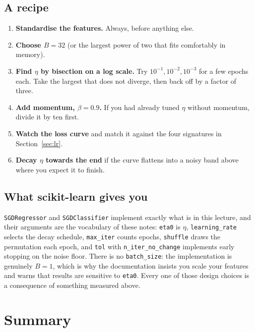 \documentclass[11pt]{article}
\begin{document}
\subsection{A recipe}

\begin{enumerate}[leftmargin=*]
  \item \textbf{Standardise the features.} Always, before anything else.
  \item \textbf{Choose $B = 32$} (or the largest power of two that fits
    comfortably in memory).
  \item \textbf{Find $\eta$ by bisection on a log scale.} Try
    $10^{-1}, 10^{-2}, 10^{-3}$ for a few epochs each. Take the largest that
    does not diverge, then back off by a factor of three.
  \item \textbf{Add momentum, $\beta = 0.9$.} If you had already tuned $\eta$
    without momentum, divide it by ten first.
  \item \textbf{Watch the loss curve} and match it against the four signatures
    in Section~\ref{sec:lr}.
  \item \textbf{Decay $\eta$ towards the end} if the curve flattens into a
    noisy band above where you expect it to finish.
\end{enumerate}

\subsection{What scikit-learn gives you}

\begin{sloppypar}
\texttt{SGDRegressor} and \texttt{SGDClassifier} implement exactly what is in
this lecture, and their arguments are the vocabulary of these notes:
\texttt{eta0} is $\eta$, \texttt{learning\_rate} selects the decay schedule,
\texttt{max\_iter} counts epochs, \texttt{shuffle} draws the permutation each
epoch, and \texttt{tol} with \texttt{n\_iter\_no\_change} implements early
stopping on the noise floor. There is no \texttt{batch\_size}: the
implementation is genuinely $B=1$, which is why the documentation insists you
scale your features and warns that results are sensitive to \texttt{eta0}.
Every one of those design choices is a consequence of something measured
above.
\end{sloppypar}

\section{Summary}
\end{document}
